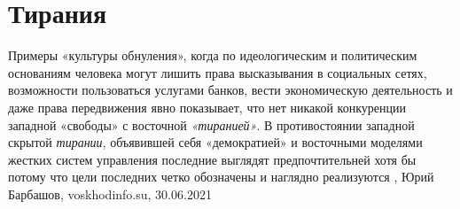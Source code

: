  
 
 
 
 
\chapter{Тирания}
\label{sec:slova.tirania}


Примеры «культуры обнуления», когда по идеологическим и политическим основаниям
человека могут лишить права высказывания в социальных сетях, возможности
пользоваться услугами банков, вести экономическую деятельность и даже права
передвижения явно показывает, что нет никакой конкуренции западной «свободы» с
восточной \emph{«тиранией»}.  В противостоянии западной скрытой \emph{тирании}, объявившей
себя «демократией» и восточными моделями жестких систем управления последние
выглядят предпочтительней хотя бы потому что цели последних четко обозначены и
наглядно реализуются
, 
Юрий Барбашов, voskhodinfo.su, 30.06.2021

